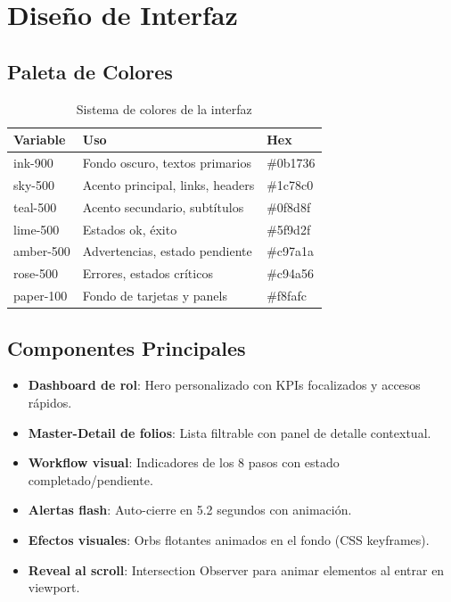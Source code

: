 \documentclass[12pt,a4paper]{article}
\begin{document}
\newpage

\section{Dise\~no de Interfaz}

\subsection{Paleta de Colores}

\begin{table}[h!]
\centering
\begin{tabular}{>{\ttfamily}lll}
\toprule
\textbf{Variable} & \textbf{Uso} & \textbf{Hex} \\
\midrule
ink-900   & Fondo oscuro, textos primarios    & \#0b1736 \\
sky-500   & Acento principal, links, headers  & \#1c78c0 \\
teal-500  & Acento secundario, subt\'itulos   & \#0f8d8f \\
lime-500  & Estados ok, \'exito               & \#5f9d2f \\
amber-500 & Advertencias, estado pendiente    & \#c97a1a \\
rose-500  & Errores, estados cr\'iticos       & \#c94a56 \\
paper-100 & Fondo de tarjetas y panels        & \#f8fafc \\
\bottomrule
\end{tabular}
\caption{Sistema de colores de la interfaz}
\end{table}

\subsection{Componentes Principales}

\begin{itemize}
  \item \textbf{Dashboard de rol}: Hero personalizado con KPIs focalizados y
    accesos r\'apidos.
  \item \textbf{Master-Detail de folios}: Lista filtrable con panel de detalle
    contextual.
  \item \textbf{Workflow visual}: Indicadores de los 8 pasos con estado
    completado/pendiente.
  \item \textbf{Alertas flash}: Auto-cierre en 5.2 segundos con animaci\'on.
  \item \textbf{Efectos visuales}: Orbs flotantes animados en el fondo
    (CSS keyframes).
  \item \textbf{Reveal al scroll}: Intersection Observer para animar elementos
    al entrar en viewport.
\end{itemize}
\end{document}
